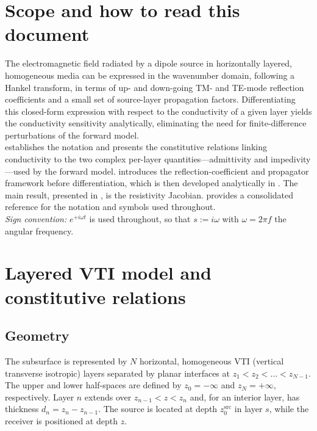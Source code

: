 \documentclass[12pt]{report}
\begin{document}
\section{Scope and how to read this document}


The electromagnetic field radiated by a dipole source in horizontally layered, homogeneous media can be expressed in the wavenumber domain, following a Hankel transform, in terms of up- and down-going TM- and TE-mode reflection coefficients and a small set of source-layer propagation factors. Differentiating this closed-form expression with respect to the conductivity of a given layer yields the conductivity sensitivity analytically, eliminating the need for finite-difference perturbations of the forward model.\\

 establishes the notation and presents the constitutive relations linking conductivity to the two complex per-layer quantities—admittivity and impedivity—used by the forward model.  introduces the reflection-coefficient and propagator framework before differentiation, which is then developed analytically in . The main result, presented in , is the resistivity Jacobian.  provides a consolidated reference for the notation and symbols used throughout.\\

\emph{Sign convention:} \(e^{+i\omega t}\) is used throughout, so that \(s := i\omega\) with \(\omega = 2\pi f\) the angular frequency.

\section{Layered VTI model and constitutive relations}
\label{sec:model}

\subsection{Geometry}

The subsurface is represented by \(N\) horizontal, homogeneous VTI
(vertical transverse isotropic) layers separated by planar interfaces at
\(z_1 < z_2 < \dots < z_{N-1}\). The upper and lower half-spaces are
defined by \(z_0=-\infty\) and \(z_N=+\infty\), respectively. Layer \(n\)
extends over \(z_{n-1}<z<z_n\) and, for an interior layer, has thickness
\(d_n=z_n-z_{n-1}\). The source is located at depth
\(z_0^{\mathrm{src}}\) in layer \(s\), while the receiver is positioned at
depth \(z\). 
\end{document}
